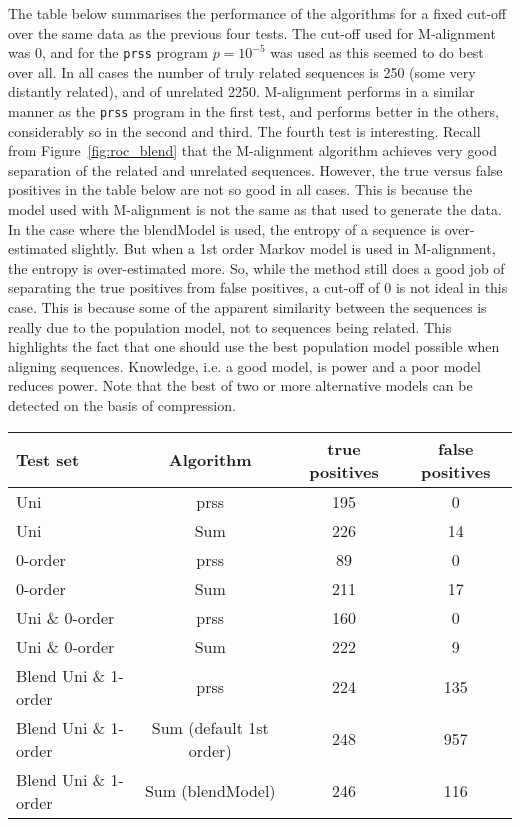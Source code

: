 \documentclass[letterpaper,11pt,oneside]{article}
\begin{document}
The table below summarises the performance of the algorithms for a fixed
cut-off over the same data as the previous four tests.  The cut-off used for
M-alignment was 0, and for the \verb!prss! program $p=10^{-5}$ was used as
this seemed to do best over all.  In all cases the number of truly related
sequences is 250 (some very distantly related), and of unrelated 2250.
M-alignment performs in a similar manner as the \verb!prss! program in the
first test, and performs better in the others, considerably so in the second
and third.  The fourth test is interesting.  Recall from
Figure~\ref{fig:roc_blend} that the M-alignment algorithm achieves very good
separation of the related and unrelated sequences.  However, the true versus
false positives in the table below are not so good in all cases.  This is
because the model used with M-alignment is not the same as that used to
generate the data.  In the case where the blendModel is used, the entropy of a
sequence is over-estimated slightly.  But when a 1st order Markov model is
used in M-alignment, the entropy is over-estimated more.  So, while the method
still does a good job of separating the true positives from false positives, a
cut-off of 0 is not ideal in this case.  This is because some of the apparent
similarity between the sequences is really due to the population model, not to
sequences being related.  This highlights the fact that one should use the
best population model possible when aligning sequences. Knowledge, i.e. a good
model, is power and a poor model reduces power. Note that the best of two or
more alternative models can be detected on the basis of compression.

\begin{center}
\begin{tabular}{|l|c||c|c|} \hline
Test set & Algorithm & true positives & false positives \\ \hline
Uni &  prss & 195 & 0  \\ 
Uni & Sum & 226 & 14  \\ \hline

0-order & prss & 89 & 0  \\ 
0-order & Sum & 211 & 17  \\ \hline

Uni \& 0-order & prss & 160 & 0  \\ 
Uni \& 0-order & Sum & 222 & 9  \\  \hline

Blend Uni \& 1-order & prss & 224 & 135  \\ 
Blend Uni \& 1-order & Sum (default 1st order) & 248 & 957 \\ 
Blend Uni \& 1-order & Sum (blendModel) & 246 & 116 \\ 
\hline \end{tabular}
\end{center}
\end{document}
